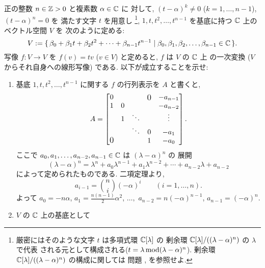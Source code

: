 \documentclass[12pt,twoside]{jarticle}
\begin{document}
\begin{question}
  \label{q:companion-jordan}
  正の整数 $n\in{\mathbb Z}>0$ と複素数 $\alpha\in{\mathbb C}$ に
  対して, $(t-\alpha)^k\ne 0$ ($k=1,\ldots,n-1$), $(t-\alpha)^n=0$ を
  満たす文字 $t$ を用意し%
  \footnote{厳密にはそのような文字 $t$ は多項式環 ${\mathbb C}[\lambda]$ の
    剰余環 ${\mathbb C}[\lambda]/((\lambda-\alpha)^n)$ の $\lambda$ で代表
    される元として構成される($t=\lambda\mathop{\mathrm{mod}}\nolimits(\lambda-\alpha)^n$).
    剰余環 ${\mathbb C}[\lambda]/((\lambda-\alpha)^n)$ の構成に関しては
    問題 ,  を参照せよ.},
  $1,t,t^2,\ldots,t^{n-1}$ を基底に持つ ${\mathbb C}$ 上のベクトル空間 $V$ を
  次のように定める:
  \begin{equation*}
    V := 
    \{\, \beta_0+\beta_1t+\beta_2t^2+\cdots+\beta_{n-1}t^{n-1}
    \mid \beta_0,\beta_1,\beta_2,\ldots,\beta_{n-1}\in{\mathbb C} \,\}.
  \end{equation*}
  写像 $f:V\to V$ を $f(v)=tv$ ($v\in V$) と定めると, $f$ は $V$ の ${\mathbb C}$ 上
  の一次変換 ($V$ からそれ自身への線形写像) である. 
  以下が成立することを示せ:
  \begin{enumerate}
  \item 基底 $1,t,t^2,\ldots,t^{n-1}$ に関する $f$ の行列表示を $A$ と書くと,
    \begin{equation*}
      A =
      \begin{bmatrix}
        0 & & & \bigzerou  & -a_{n-1} \\
        1 & 0 &        &   & -a_{n-2} \\
          & 1 & \ddots &   & \vdots \\
          &   & \ddots & 0 & -a_1 \\
        \bigzerol & &  & 1 & -a_0 \\
      \end{bmatrix}.
    \end{equation*}
    ここで $a_0,a_1,\ldots,a_{n-2},a_{n-1}\in{\mathbb C}$ は $(\lambda-\alpha)^n$ の
    展開
    \begin{equation*}
      (\lambda-\alpha)^n = 
      \lambda^n + a_0\lambda^{n-1} + a_1\lambda^{n-2} + 
      \cdots + a_{n-2}\lambda + a_{n-2}
    \end{equation*}
    によって定められたものである.  二項定理より,
    \begin{equation*}
      a_{i-1} = \binom{n}{i}(-\alpha)^i
      \qquad (i=1,\ldots,n).
    \end{equation*}
    よって $a_0=-n\alpha$, $a_1=\frac{n(n-1)}{2}\alpha^2$, 
    $\ldots,$ $a_{n-2}=n(-\alpha)^{n-1}$, $a_{n-1}=(-\alpha)^n$.
  \item $V$ の ${\mathbb C}$ 上の基底として %

\end{enumerate}
\end{question}
\end{document}
